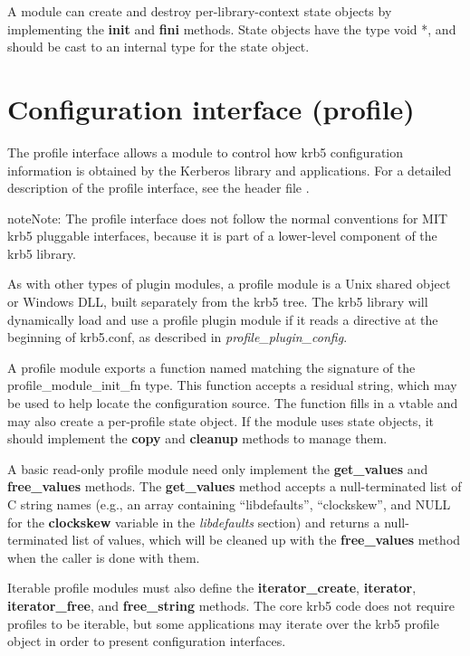 \documentclass[letterpaper,10pt,english]{sphinxmanual}
\begin{document}
A module can create and destroy per-library-context state objects by
implementing the \textbf{init} and \textbf{fini} methods.  State objects have
the type void *, and should be cast to an internal type for the state
object.


\section{Configuration interface (profile)}
\label{plugindev/profile:configuration-interface-profile}\label{plugindev/profile::doc}\label{plugindev/profile:profile-plugin}
The profile interface allows a module to control how krb5
configuration information is obtained by the Kerberos library and
applications.  For a detailed description of the profile interface,
see the header file .

\begin{notice}{note}{Note:}
The profile interface does not follow the normal conventions
for MIT krb5 pluggable interfaces, because it is part of a
lower-level component of the krb5 library.
\end{notice}

As with other types of plugin modules, a profile module is a Unix
shared object or Windows DLL, built separately from the krb5 tree.
The krb5 library will dynamically load and use a profile plugin module
if it reads a  directive at the beginning of krb5.conf, as
described in \emph{profile\_plugin\_config}.

A profile module exports a function named 
matching the signature of the profile\_module\_init\_fn type.  This
function accepts a residual string, which may be used to help locate
the configuration source.  The function fills in a vtable and may also
create a per-profile state object.  If the module uses state objects,
it should implement the \textbf{copy} and \textbf{cleanup} methods to manage
them.

A basic read-only profile module need only implement the
\textbf{get\_values} and \textbf{free\_values} methods.  The \textbf{get\_values} method
accepts a null-terminated list of C string names (e.g., an array
containing ``libdefaults'', ``clockskew'', and NULL for the \textbf{clockskew}
variable in the \emph{libdefaults} section) and returns a
null-terminated list of values, which will be cleaned up with the
\textbf{free\_values} method when the caller is done with them.

Iterable profile modules must also define the \textbf{iterator\_create},
\textbf{iterator}, \textbf{iterator\_free}, and \textbf{free\_string} methods.  The
core krb5 code does not require profiles to be iterable, but some
applications may iterate over the krb5 profile object in order to
present configuration interfaces.
\end{document}
